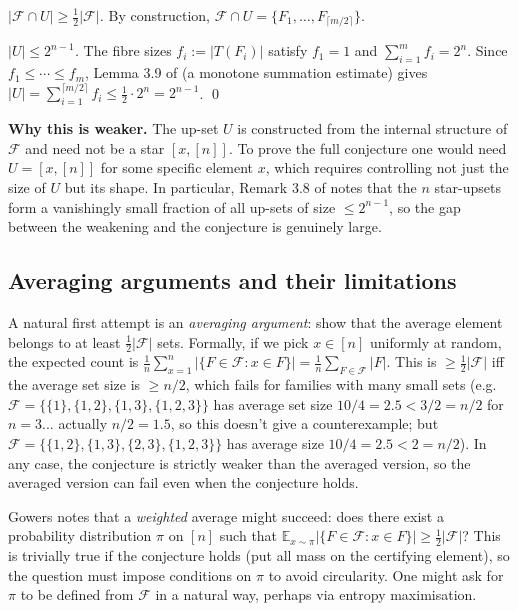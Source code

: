 \documentclass[11pt]{article}
\theoremstyle{definition}
\theoremstyle{remark}
\newcommand{\F}{\mathcal{F}}
\begin{document}
\emph{$|\F \cap U| \ge \frac{1}{2}|\F|$.}
By construction, $\F \cap U = \{F_1, \ldots, F_{\lceil m/2 \rceil}\}$.

\emph{$|U| \le 2^{n-1}$.}
The fibre sizes $f_i := |T(F_i)|$ satisfy $f_1 = 1$ and $\sum_{i=1}^m f_i = 2^n$.
Since $f_1 \le \cdots \le f_m$, Lemma 3.9 of \cite{nagel2023}
(a monotone summation estimate) gives
$|U| = \sum_{i=1}^{\lceil m/2 \rceil} f_i \le \frac{1}{2}\cdot 2^n = 2^{n-1}$.
\qed

\textbf{Why this is weaker.}
The up-set $U$ is constructed from the internal structure of $\F$ and
need not be a star $[x,[n]]$.
To prove the full conjecture one would need $U = [x, [n]]$ for some specific
element $x$, which requires controlling not just the size of $U$ but its shape.
In particular, Remark 3.8 of \cite{nagel2023} notes that the $n$ star-upsets
form a vanishingly small fraction of all up-sets of size $\le 2^{n-1}$,
so the gap between the weakening and the conjecture is genuinely large.

\subsection{Averaging arguments and their limitations}

A natural first attempt is an \emph{averaging argument}: show that the average
element belongs to at least $\frac{1}{2}|\F|$ sets.
Formally, if we pick $x \in [n]$ uniformly at random, the expected count is
$\frac{1}{n}\sum_{x=1}^{n} |\{F \in \F : x \in F\}| = \frac{1}{n}\sum_{F \in \F}|F|$.
This is $\ge \frac{1}{2}|\F|$ iff the average set size is $\ge n/2$, which fails for
families with many small sets (e.g.\ $\F = \{\{1\}, \{1,2\}, \{1,3\}, \{1,2,3\}\}$ has
average set size $10/4 = 2.5 < 3/2 = n/2$ for $n = 3$... actually $n/2 = 1.5$,
so this doesn't give a counterexample; but $\F = \{\{1,2\},\{1,3\},\{2,3\},\{1,2,3\}\}$
has average size $10/4 = 2.5 < 2 = n/2$).
In any case, the conjecture is strictly weaker than the averaged version,
so the averaged version can fail even when the conjecture holds.

Gowers \cite{gowers2016} notes that a \emph{weighted} average might succeed:
does there exist a probability distribution $\pi$ on $[n]$ such that
$\mathbb{E}_{x \sim \pi}|\{F \in \F : x \in F\}| \ge \frac{1}{2}|\F|$?
This is trivially true if the conjecture holds (put all mass on the certifying element),
so the question must impose conditions on $\pi$ to avoid circularity.
One might ask for $\pi$ to be defined from $\F$ in a natural way, perhaps via
entropy maximisation.
\end{document}
